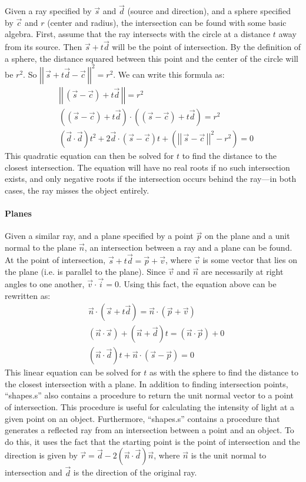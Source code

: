 \documentclass[10pt]{article}
\newcommand{\norm}[1]{\left|\!\left|\,{#1}\,\right|\!\right|}
\begin{document}
Given a ray specified by $\vec{s}$ and $\vec{d}$ (source
and direction), and a sphere specified by $\vec{c}$ and $r$ (center
and radius), the intersection can be found with some basic algebra.
First, assume that the ray intersects with the circle at a distance
$t$ away from its source. Then $\vec{s} + t\vec{d}$ will be the point
of intersection. By the definition of a sphere, the distance squared
between this point and the center of the circle will be $r^2$. So
$\norm{\vec{s}+t\vec{d}-\vec{c}}^2 = r^2$. We can write this formula as:
\begin{align*}
& \norm{(\vec{s}-\vec{c})+t\vec{d}}=r^2 \\
& \left((\vec{s}-\vec{c})+t\vec{d}\right)\cdot\left((\vec{s}-\vec{c})+t\vec{d}\right) = r^2 \\
& (\vec{d}\cdot\vec{d})t^2 + 2\vec{d}\cdot(\vec{s}-\vec{c})t+\left(\norm{\vec{s}-\vec{c}}^2-r^2\right) = 0
\end{align*}
This quadratic equation can then be solved for $t$ to find the distance
to the closest intersection. The equation will have no real roots if no
such intersection exists, and only negative roots if the intersection
occurs behind the ray---in both cases, the ray misses the object
entirely.

\paragraph{Planes}

Given a similar ray, and a plane specified by a point
$\vec{p}$ on the plane and a unit normal to the plane $\vec{n}$, an
intersection between a ray and a plane can be found. At the point of
intersection, $\vec{s}+t\vec{d} = \vec{p}+\vec{v}$, where $\vec{v}$ is
some vector that lies on the plane (i.e. is parallel to the plane).
Since $\vec{v}$ and $\vec{n}$ are necessarily at right angles to one
another, $\vec{v}\cdot\vec{i}=0$. Using this fact, the equation above
can be rewritten as:
\begin{align*}
& \vec{n}\cdot(\vec{s}+t\vec{d}) = \vec{n}\cdot(\vec{p}+\vec{v}) \\
& \left(\vec{n}\cdot\vec{s}\right) + (\vec{n}+\vec{d})t = (\vec{n}\cdot\vec{p}) + 0 \\
& (\vec{n}\cdot\vec{d})t + \vec{n}\cdot(\vec{s}-\vec{p}) = 0
\end{align*}
This linear equation can be solved for $t$ as with the sphere to find
the distance to the closest intersection with a plane. In addition to
finding intersection points, ``shapes.s'' also contains a procedure
to return the unit normal vector to a point of intersection. This
procedure is useful for calculating the intensity of light at a given
point on an object. Furthermore, ``shapes.s'' contains a procedure
that generates a reflected ray from an intersection between a point
and an object. To do this, it uses the fact that the starting point
is the point of intersection and the direction is given by $\vec{r} =
\vec{d}-2(\vec{n}\cdot\vec{d})\vec{n}$, where $\vec{n}$ is the unit
normal to intersection and $\vec{d}$ is the direction of the original
ray.
\end{document}
